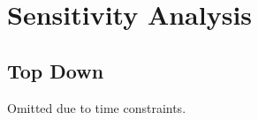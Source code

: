 \section{Sensitivity Analysis}\label{sec:sensitivity_analysis}
\subsection{Top Down}\label{subsec:sensitivity_analysis_top_down}
Omitted due to time constraints.